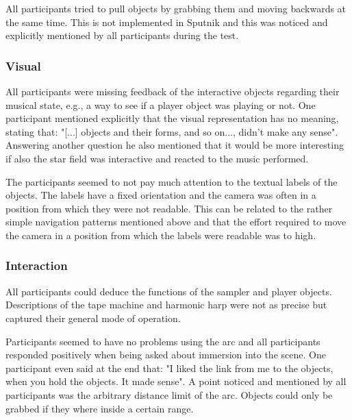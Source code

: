 \documentclass[10pt,a4paper]{scrartcl}
\begin{document}
All participants tried to pull objects by grabbing them and moving backwards at the same time. This is not implemented in Sputnik and this was noticed and explicitly mentioned by all participants during the test.



\subsubsection{Visual}
All participants were missing feedback of the interactive objects regarding their musical state, e.g., a way to see if a player object was playing or not. One participant mentioned explicitly that the visual representation has no meaning, stating that: "[...] objects and their forms, and so on..., didn't make any sense". Answering another question he also mentioned that it would be more interesting if also the star field was interactive and reacted to the music performed.

The participants seemed to not pay much attention to the textual labels of the objects. The labels have a fixed orientation and the camera was often in a position from which they were not readable. This can be related to the rather simple navigation patterns mentioned above and that the effort required to move the camera in a position from which the labels were readable was to high.



\subsubsection{Interaction}
All participants could deduce the functions of the sampler and player objects. Descriptions of the tape machine and harmonic harp were not as precise but captured their general mode of operation. 

Participants seemed to have no problems using the arc and all participants responded positively when being asked about immersion into the scene. One participant even said at the end that: "I liked the link from me to the objects, when you hold the objects. It made sense". A point noticed and mentioned by all participants was the arbitrary distance limit of the arc. Objects could only be grabbed if they where inside a certain range.
\end{document}
